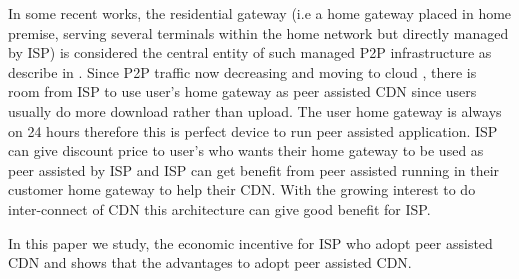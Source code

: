\documentclass[paper]{ieice}
\begin{document}
In some recent works, the residential gateway (i.e a home gateway placed in home premise, serving several terminals within the home network but directly managed by ISP) is considered the central entity of such managed P2P infrastructure as describe in \cite{Misra:2010:IPS:1811099.1811064,Cha:2008:NTP:1855641.1855646}.
Since P2P traffic now decreasing and moving to cloud \cite{Labovitz:2010:IIT:2043164.1851194}, there is room from ISP to use user's home gateway as peer assisted CDN since users usually do more download rather than upload.
The user home gateway is always on 24 hours therefore this is perfect device to run peer assisted application.
ISP can give discount price to user's who wants their home gateway to be used as peer assisted by ISP and ISP can get benefit from peer assisted running in their customer home gateway to help their CDN.
With the growing interest to do inter-connect of CDN \cite{cdni,oceanproject} this architecture can give good benefit for ISP.    

In this paper we study, the economic incentive for ISP who adopt peer assisted CDN and shows that the advantages to adopt peer assisted CDN. 



\end{document}
